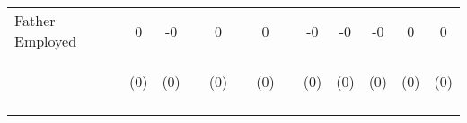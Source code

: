 \begin{tabular}{lcccccccccccc}
\noalign{\smallskip}Father Employed & 0 & -0 &  & 0 &  & 0 &  & -0 & -0 & -0 & 0 & 0\\
 & \begin{footnotesize}(0)\end{footnotesize} & \begin{footnotesize}(0)\end{footnotesize} & \begin{footnotesize}\end{footnotesize} & \begin{footnotesize}(0)\end{footnotesize} & \begin{footnotesize}\end{footnotesize} & \begin{footnotesize}(0)\end{footnotesize} & \begin{footnotesize}\end{footnotesize} & \begin{footnotesize}(0)\end{footnotesize} & \begin{footnotesize}(0)\end{footnotesize} & \begin{footnotesize}(0)\end{footnotesize} & \begin{footnotesize}(0)\end{footnotesize} & \begin{footnotesize}(0)\end{footnotesize}\\
\noalign{\smallskip}\hline\end{tabular}\\
